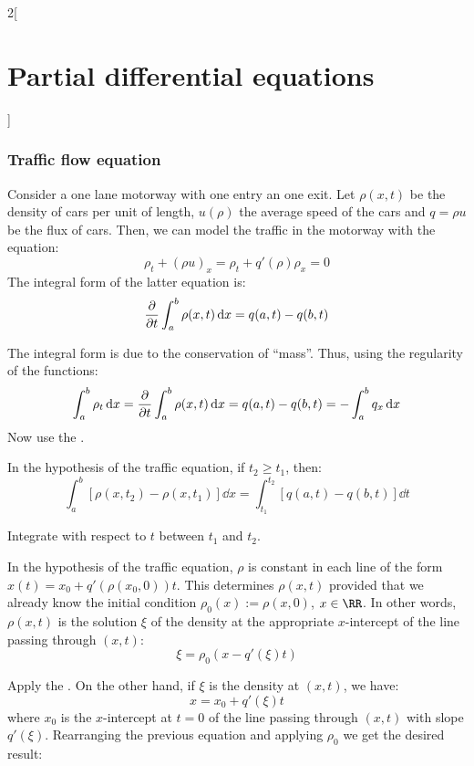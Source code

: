 \documentclass[../../../main_math.tex]{subfiles}
\begin{document}
\begin{multicols}{2}[\section{Partial differential equations}]
  \subsubsection{Traffic flow equation}
  \begin{proposition}
    Consider a one lane motorway with one entry an one exit. Let $\rho(x,t)$ be the density of cars per unit of length, $u(\rho)$ the average speed of the cars and $q=\rho u$ be the flux of cars. Then, we can model the traffic in the motorway with the equation: $$\rho_t+{(\rho u)}_x=\rho_t+q'(\rho){\rho}_x=0$$
    The integral form of the latter equation is:
    \begin{equation}\label{PDE:trafficintegral}
      \pdv{}{t}\int_{a}^b\rho(x,t)\dd{x}=q(a,t)-q(b,t)
    \end{equation}
  \end{proposition}
  \begin{sproof}
    The integral form is due to the conservation of ``mass''. Thus, using the regularity of the functions:
    $$\int_a^b\rho_t\dd{x}=\pdv{}{t}\int_{a}^b\rho(x,t)\dd{x}=q(a,t)-q(b,t)=-\int_a^bq_x\dd{x}$$
    Now use the .
  \end{sproof}
  \begin{proposition}
    In the hypothesis of the traffic equation, if $t_2\geq t_1$, then:
    \begin{equation}\label{PDE:trafficintegral2}
      \int_{a}^b[\rho(x,t_2)-\rho(x,t_1)]\dd{x}=\int_{t_1}^{t_2}[q(a,t)-q(b,t)]\dd{t}
    \end{equation}
  \end{proposition}
  \begin{sproof}
    Integrate  with respect to $t$ between $t_1$ and $t_2$.
  \end{sproof}
  \begin{proposition}
    In the hypothesis of the traffic equation, $\rho$ is constant in each line of the form $x(t)=x_0+q'(\rho(x_0,0))t$.
    This determines $\rho(x,t)$ provided that we already know the initial condition $\rho_0(x):=\rho(x,0)$, $x\in\RR$. In other words, $\rho(x,t)$ is the solution $\xi$ of the density at the appropriate $x$-intercept of the line passing through $(x,t)$: $$\xi=\rho_0(x-q'(\xi)t)$$
  \end{proposition}
  \begin{sproof}
    Apply the . On the other hand, if $\xi$ is the density at $(x,t)$, we have: $$x=x_0+q'(\xi)t$$ where $x_0$ is the $x$-intercept at $t=0$ of the line passing through $(x,t)$ with slope $q'(\xi)$. Rearranging the previous equation and applying $\rho_0$ we get the desired result:

\end{sproof}
\end{multicols}
\end{document}
